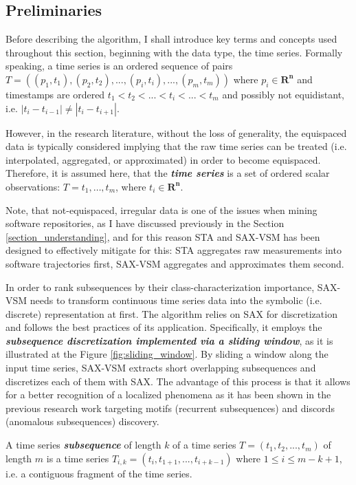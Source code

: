 \subsection{Preliminaries}
Before describing the algorithm, I shall introduce key terms and concepts used throughout this section, beginning with the data type,
the time series.
Formally speaking, a time series is an ordered sequence of pairs 
\mbox{$T=((p_{1},t_{1}),(p_{2},t_{2}),...,(p_{i},t_{i}),...,(p_{m},t_{m}))$}
where $p_{i} \in \mathbf{R^{n}}$ and timestamps are ordered $t_{1} < t_{2} < ... < t_{i} <...<t_{m}$ 
and possibly not equidistant, i.e. $|t_{i}-t_{i-1}| \neq |t_{i}-t_{i+1}|$.

However, in the research literature, without the loss of generality, the equispaced data is typically considered implying that the 
raw time series can be treated (i.e. interpolated, aggregated, or approximated) in order to become equispaced. 
Therefore, it is assumed here, that the \textbf{\textit{time series}} is a set of ordered scalar observations: 
$T = t_{1},\dots,t_{m}$, where $t_{i} \in \mathbf{R^{n}}$.

Note, that not-equispaced, irregular data is one of the issues when mining software repositories, as I have discussed previously in 
the Section \ref{section_understanding}, and for this reason STA and SAX-VSM has been designed to effectively mitigate for this: 
STA aggregates raw measurements into software trajectories first, SAX-VSM aggregates and approximates them second. 

In order to rank subsequences by their class-characterization importance, SAX-VSM needs to transform continuous time series data 
into the symbolic (i.e. discrete) representation at first. The algorithm relies on SAX \cite{citeulike:2821475} for discretization and follows 
the best practices of its application. Specifically, it employs the \textit{\textbf{subsequence discretization implemented via a sliding window}}, 
as it is illustrated at the Figure \ref{fig:sliding_window}. By sliding a window along the input time series, SAX-VSM extracts short 
overlapping subsequences and discretizes each of them with SAX. The advantage of this process is that it allows for a better recognition of 
a localized phenomena as it has been shown in the previous research work targeting motifs (recurrent subsequences) \cite{citeulike:3977965} 
and discords (anomalous subsequences) \cite{citeulike:3175749} discovery. 

A time series \textbf{\textit{subsequence}} of length $k$ of a time series $T = (t_{1}, t_{2},...,t_{m})$ of length $m$ is a time 
series $T_{i,k} = (t_{i},t_{1+1},...,t_{i+k-1})$  where $1 \leq i \leq m - k + 1$, i.e. a contiguous fragment of the time series.

